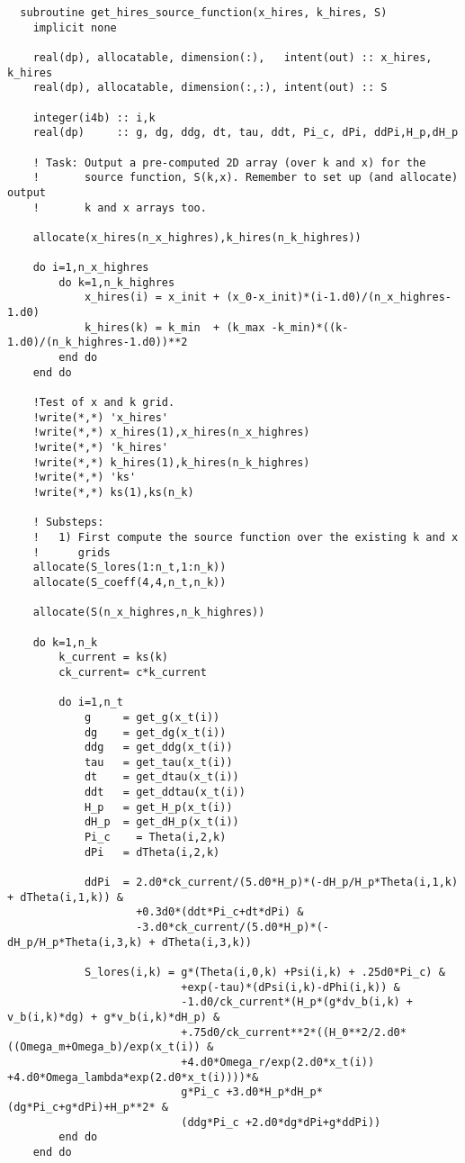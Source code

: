 \documentclass[a4paper]{report}
\begin{document}
\begin{verbatim}
  subroutine get_hires_source_function(x_hires, k_hires, S)
    implicit none

    real(dp), allocatable, dimension(:),   intent(out) :: x_hires, k_hires
    real(dp), allocatable, dimension(:,:), intent(out) :: S

    integer(i4b) :: i,k
    real(dp)     :: g, dg, ddg, dt, tau, ddt, Pi_c, dPi, ddPi,H_p,dH_p

    ! Task: Output a pre-computed 2D array (over k and x) for the 
    !       source function, S(k,x). Remember to set up (and allocate) output 
    !       k and x arrays too. 

    allocate(x_hires(n_x_highres),k_hires(n_k_highres))

    do i=1,n_x_highres    
        do k=1,n_k_highres
            x_hires(i) = x_init + (x_0-x_init)*(i-1.d0)/(n_x_highres-1.d0)
            k_hires(k) = k_min  + (k_max -k_min)*((k-1.d0)/(n_k_highres-1.d0))**2
        end do 
    end do

    !Test of x and k grid.
    !write(*,*) 'x_hires'
    !write(*,*) x_hires(1),x_hires(n_x_highres)
    !write(*,*) 'k_hires'
    !write(*,*) k_hires(1),k_hires(n_k_highres)
    !write(*,*) 'ks'
    !write(*,*) ks(1),ks(n_k)

    ! Substeps:
    !   1) First compute the source function over the existing k and x
    !      grids
    allocate(S_lores(1:n_t,1:n_k))
    allocate(S_coeff(4,4,n_t,n_k))

    allocate(S(n_x_highres,n_k_highres))

    do k=1,n_k
        k_current = ks(k)
        ck_current= c*k_current

        do i=1,n_t
            g     = get_g(x_t(i))
            dg    = get_dg(x_t(i))
            ddg   = get_ddg(x_t(i))
            tau   = get_tau(x_t(i))
            dt    = get_dtau(x_t(i))
            ddt   = get_ddtau(x_t(i))
            H_p   = get_H_p(x_t(i))
            dH_p  = get_dH_p(x_t(i))
            Pi_c    = Theta(i,2,k)
            dPi   = dTheta(i,2,k)

            ddPi  = 2.d0*ck_current/(5.d0*H_p)*(-dH_p/H_p*Theta(i,1,k) + dTheta(i,1,k)) &
                    +0.3d0*(ddt*Pi_c+dt*dPi) &
                    -3.d0*ck_current/(5.d0*H_p)*(-dH_p/H_p*Theta(i,3,k) + dTheta(i,3,k))

            S_lores(i,k) = g*(Theta(i,0,k) +Psi(i,k) + .25d0*Pi_c) &
                           +exp(-tau)*(dPsi(i,k)-dPhi(i,k)) &
                           -1.d0/ck_current*(H_p*(g*dv_b(i,k) + v_b(i,k)*dg) + g*v_b(i,k)*dH_p) &
                           +.75d0/ck_current**2*((H_0**2/2.d0*((Omega_m+Omega_b)/exp(x_t(i)) &
                           +4.d0*Omega_r/exp(2.d0*x_t(i)) +4.d0*Omega_lambda*exp(2.d0*x_t(i))))*&
                           g*Pi_c +3.d0*H_p*dH_p*(dg*Pi_c+g*dPi)+H_p**2* &
                           (ddg*Pi_c +2.d0*dg*dPi+g*ddPi))
        end do
    end do


\end{verbatim}
\end{document}
